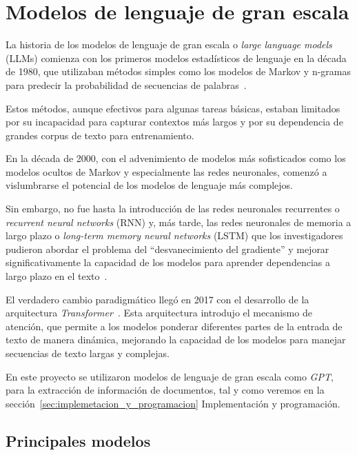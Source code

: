 \section{Modelos de lenguaje de gran escala}\label{sec:modelos_lenguaje_gran_escala}

La historia de los modelos de lenguaje de gran escala o \textit{large language models} (LLMs) comienza con los
primeros modelos estadísticos de lenguaje en la década de 1980, que utilizaban métodos simples como los modelos de
Markov y n-gramas para predecir la probabilidad de secuencias de palabras~\cite{article_jelinek_1997}.

Estos métodos, aunque efectivos para algunas tareas básicas, estaban limitados por su incapacidad para capturar
contextos más largos y por su dependencia de grandes corpus de texto para entrenamiento.

En la década de 2000, con el advenimiento de modelos más sofisticados como los modelos ocultos de Markov y especialmente
las redes neuronales, comenzó a vislumbrarse el potencial de los modelos de lenguaje más complejos.

Sin embargo, no fue hasta la introducción de las redes neuronales recurrentes o \textit{recurrent neural networks} (RNN)
y, más tarde, las redes neuronales de memoria a largo plazo o \textit{long-term memory neural networks} (LSTM) que
los investigadores pudieron abordar el problema del ``desvanecimiento del gradiente'' y mejorar significativamente la
capacidad de los modelos para aprender dependencias a largo plazo en el texto~\cite{article_hochreiter_1997}.

El verdadero cambio paradigmático llegó en 2017 con el desarrollo de la arquitectura
\textit{Transformer}~\cite{article_vaswani_2017}.
Esta arquitectura introdujo el mecanismo de atención, que permite a los modelos ponderar diferentes partes de la entrada
de texto de manera dinámica, mejorando la capacidad de los modelos para manejar secuencias de texto largas y complejas.

En este proyecto se utilizaron modelos de lenguaje de gran escala como \textit{GPT}, para la extracción de información
de documentos, tal y como veremos en la sección~\ref{sec:implemetacion_y_programacion} Implementación y programación.

\subsection*{Principales modelos}

